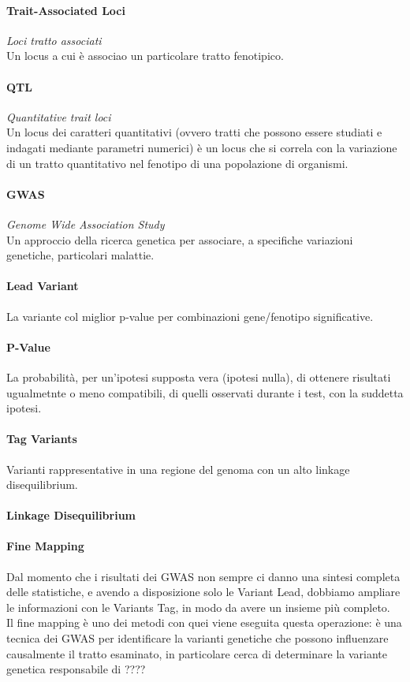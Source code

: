\documentclass{article}
\begin{document}
\paragraph{Trait-Associated Loci}\textit{Loci tratto associati}\\Un locus a cui è associao un particolare tratto fenotipico.
\paragraph{QTL}\textit{Quantitative trait loci}\\
    Un locus dei caratteri quantitativi (ovvero tratti che possono essere studiati e indagati mediante parametri numerici) è un locus che si correla con la variazione di un tratto quantitativo nel fenotipo di una popolazione di organismi.
\paragraph{GWAS}\textit{Genome Wide Association Study}\\Un approccio della ricerca genetica per associare, a specifiche variazioni genetiche, particolari malattie.
\paragraph{Lead Variant}La variante col miglior p-value per combinazioni gene/fenotipo significative.
\paragraph{P-Value}La probabilità, per un'ipotesi supposta vera (ipotesi nulla), di ottenere risultati ugualmetnte o meno compatibili, di quelli osservati durante i test, con la suddetta ipotesi.
\paragraph{Tag Variants}Varianti rappresentative in una regione del genoma con un alto linkage disequilibrium.
\paragraph{Linkage Disequilibrium}
\paragraph{Fine Mapping}Dal momento che i risultati dei GWAS non sempre ci danno una sintesi completa delle statistiche, e avendo a disposizione solo le Variant Lead, dobbiamo ampliare le informazioni con le Variants Tag, in modo da avere un insieme più completo.\\Il fine mapping è uno dei metodi con quei viene eseguita questa operazione: è una tecnica dei GWAS per identificare la varianti genetiche che possono influenzare causalmente il tratto esaminato, in particolare cerca di determinare la variante genetica responsabile di ????
\end{document}
